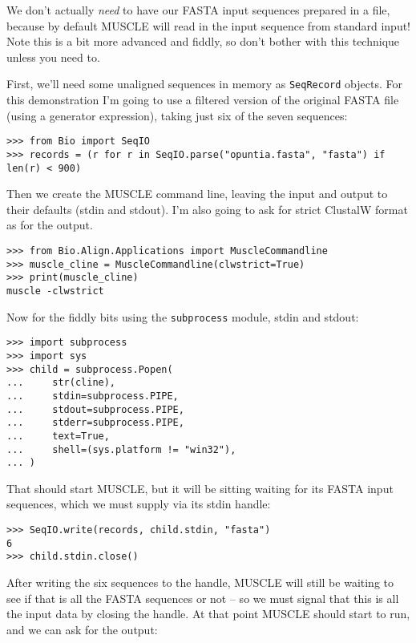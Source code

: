 We don't actually \emph{need} to have our FASTA input sequences prepared in a file,
because by default MUSCLE will read in the input sequence from standard input!
Note this is a bit more advanced and fiddly, so don't bother with this technique
unless you need to.

First, we'll need some unaligned sequences in memory as \verb|SeqRecord| objects.
For this demonstration I'm going to use a filtered version of the original FASTA
file (using a generator expression), taking just six of the seven sequences:

\begin{verbatim}
>>> from Bio import SeqIO
>>> records = (r for r in SeqIO.parse("opuntia.fasta", "fasta") if len(r) < 900)
\end{verbatim}

Then we create the MUSCLE command line, leaving the input and output to their
defaults (stdin and stdout). I'm also going to ask for strict ClustalW format
as for the output.

\begin{verbatim}
>>> from Bio.Align.Applications import MuscleCommandline
>>> muscle_cline = MuscleCommandline(clwstrict=True)
>>> print(muscle_cline)
muscle -clwstrict
\end{verbatim}

Now for the fiddly bits using the \verb|subprocess| module, stdin and stdout:

\begin{verbatim}
>>> import subprocess
>>> import sys
>>> child = subprocess.Popen(
...     str(cline),
...     stdin=subprocess.PIPE,
...     stdout=subprocess.PIPE,
...     stderr=subprocess.PIPE,
...     text=True,
...     shell=(sys.platform != "win32"),
... )
\end{verbatim}

That should start MUSCLE, but it will be sitting waiting for its FASTA input
sequences, which we must supply via its stdin handle:

\begin{verbatim}
>>> SeqIO.write(records, child.stdin, "fasta")
6
>>> child.stdin.close()
\end{verbatim}

After writing the six sequences to the handle, MUSCLE will still be waiting
to see if that is all the FASTA sequences or not -- so we must signal that
this is all the input data by closing the handle. At that point MUSCLE should
start to run, and we can ask for the output:

